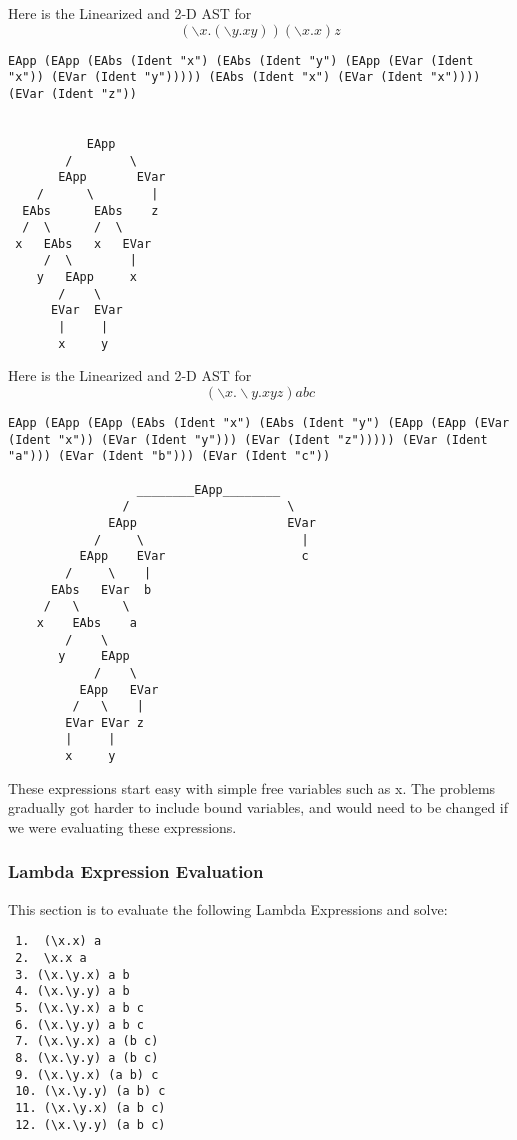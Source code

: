 \documentclass{article}
\theoremstyle{theorem}
\theoremstyle{definition}
\theoremstyle{remark}
\begin{document}
\noindent\newline Here is the Linearized and 2-D AST for $$(\backslash x. (\backslash y . x y)) (\backslash x.x) z$$
\begin{verbatim}
EApp (EApp (EAbs (Ident "x") (EAbs (Ident "y") (EApp (EVar (Ident "x")) (EVar (Ident "y"))))) (EAbs (Ident "x") (EVar (Ident "x")))) (EVar (Ident "z"))


           EApp
        /        \
       EApp       EVar
    /      \        |
  EAbs      EAbs    z
  /  \      /  \
 x   EAbs   x   EVar
     /  \        |
    y   EApp     x
       /    \
      EVar  EVar
       |     |
       x     y
\end{verbatim}
\noindent\newline Here is the Linearized and 2-D AST for $$(\backslash x . \backslash y . x y z) a b c$$
\begin{verbatim}
EApp (EApp (EApp (EAbs (Ident "x") (EAbs (Ident "y") (EApp (EApp (EVar (Ident "x")) (EVar (Ident "y"))) (EVar (Ident "z"))))) (EVar (Ident "a"))) (EVar (Ident "b"))) (EVar (Ident "c"))

                  ________EApp________
                /                      \
              EApp                     EVar
            /     \                      |
          EApp    EVar                   c
        /     \    |
      EAbs   EVar  b
     /   \      \  
    x    EAbs    a
        /    \
       y     EApp 
            /    \
          EApp   EVar 
         /   \    |
        EVar EVar z
        |     |
        x     y
\end{verbatim}
\noindent\newline\newline These expressions start easy with simple free variables such as x. The problems gradually got harder to include bound variables, and would need to be changed if we were evaluating these expressions.

\subsubsection{Lambda Expression Evaluation}
This section is to evaluate the following Lambda Expressions and solve:
\begin{verbatim}
 1.  (\x.x) a         
 2.  \x.x a           
 3. (\x.\y.x) a b    
 4. (\x.\y.y) a b    
 5. (\x.\y.x) a b c  
 6. (\x.\y.y) a b c  
 7. (\x.\y.x) a (b c)
 8. (\x.\y.y) a (b c)
 9. (\x.\y.x) (a b) c
 10. (\x.\y.y) (a b) c
 11. (\x.\y.x) (a b c)
 12. (\x.\y.y) (a b c)
\end{verbatim}
\end{document}
